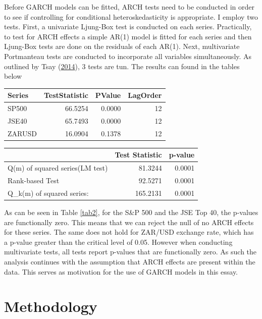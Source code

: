 \documentclass[11pt,preprint, authoryear]{elsarticle}
\let\origtable\table
\let\endorigtable\endtable
\renewenvironment{table}[1][2] {
    \expandafter\origtable\expandafter[H]
} {
    \endorigtable
}
\numberwithin{equation}{section}
\numberwithin{figure}{section}
\numberwithin{table}{section}
\begin{document}
Before GARCH models can be fitted, ARCH tests need to be conducted in
order to see if controlling for conditional heteroskedasticity is
appropriate. I employ two tests. First, a univariate Ljung-Box test is
conducted on each series. Practically, to test for ARCH effects a simple
AR(1) model is fitted for each series and then Ljung-Box tests are done
on the residuals of each AR(1). Next, multivariate Portmanteau tests are
conducted to incorporate all variables simultaneously. As outlined by
Tsay (\protect\hyperlink{ref-Tsay2014}{2014}), 3 tests are tun. The
results can found in the tables below

\begin{table}[H]
\centering
\caption{Ljung-Box Tests \label{tab2}} 
\begin{tabular}{lrrr}
  \hline
Series & TestStatistic & PValue & LagOrder \\ 
  \hline
SP500 & 66.5254 & 0.0000 & 12 \\ 
  JSE40 & 65.7493 & 0.0000 & 12 \\ 
  ZARUSD & 16.0904 & 0.1378 & 12 \\ 
   \hline
\end{tabular}
\end{table}

\begin{table}[H]
\centering
\caption{MV Portmanteau Tests \label{tab3}} 
\begin{tabular}{lrr}
  \hline
 & Test Statistic & p-value \\ 
  \hline
Q(m) of squared series(LM test) & 81.3244 & 0.0001 \\ 
  Rank-based Test & 92.5271 & 0.0001 \\ 
  Q\_k(m) of squared series: & 165.2131 & 0.0001 \\ 
   \hline
\end{tabular}
\end{table}

As can be seen in Table \ref{tab2}, for the S\&P 500 and the JSE Top 40,
the p-values are functionally zero. This means that we can reject the
null of no ARCH effects for these series. The same does not hold for
ZAR/USD exchange rate, which has a p-value greater than the critical
level of 0.05. However when conducting multivariate tests, all tests
report p-values that are functionally zero. As such the analysis
continues with the assumption that ARCH effects are present within the
data. This serves as motivation for the use of GARCH models in this
essay.

\hypertarget{methodology}{%
\section{Methodology}\label{methodology}}
\end{document}
